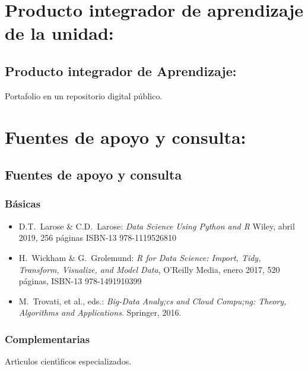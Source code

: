 \documentclass[10 pt]{article}
\begin{document}

  
\newpage

\section{Producto integrador de aprendizaje de la unidad:}
\subsection{Producto integrador de Aprendizaje:} Portafolio en un repositorio digital p\'{u}blico.

\section{Fuentes de apoyo y consulta:}
\subsection{Fuentes de apoyo y consulta}
\subsubsection{B\'{a}sicas}

\begin{itemize}[itemsep=0em]
  
\item{D.T.\ {\sc Larose} \& C.D.\ {\sc Larose}: {\em Data Science Using Python and R}
    Wiley, abril 2019, 256 p\'{a}ginas ISBN-13 978-1119526810}
  
\item{H.\ {\sc Wickham} \& G.\ {\sc  Grolemund}:
    {\em R for Data Science: Import, Tidy, Transform, Visualize, and Model Data},
    O'Reilly Media, enero 2017, 
    520 p\'{a}ginas, ISBN-13 978-1491910399}
  
\item{M.\ {\sc Trovati}, et al., eds.: {\em Big-Data Analy;cs and
      Cloud Compu;ng: Theory, Algorithms and Applications}. Springer,
    2016.}
\end{itemize}

\subsubsection{Complementarias}

Art\'{\i}culos cient\'{\i}ficos especializados.

\label{final} %


\end{document}
